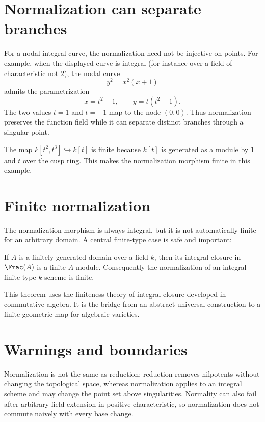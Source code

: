 

\section{Normalization can separate branches}
For a nodal integral curve, the normalization need not be injective on points.  For example, when the displayed
curve is integral (for instance over a field of characteristic not $2$), the nodal curve
\[
y^2=x^2(x+1)
\]
admits the parametrization
\[
x=t^2-1,\qquad y=t(t^2-1).
\]
The two values $t=1$ and $t=-1$ map to the node $(0,0)$.  Thus normalization preserves the function field while
it can separate distinct branches through a singular point.



\begin{example}\label{ex:vi28-expand-03}
The map $k[t^2,t^3]\hookrightarrow k[t]$ is finite because $k[t]$ is generated as a module by $1$ and $t$ over the cusp ring.  This makes the normalization morphism finite in this example.
\end{example}
\section{Finite normalization}
The normalization morphism is always integral, but it is not automatically finite for an arbitrary domain.  A
central finite-type case is safe and important:

\begin{theorem}\label{thm:vi28-finite-normalization}
If $A$ is a finitely generated domain over a field $k$, then its integral closure in $\Frac(A)$ is a finite
$A$-module.  Consequently the normalization of an integral finite-type $k$-scheme is finite.
\end{theorem}

This theorem uses the finiteness theory of integral closure developed in commutative algebra.  It is the bridge
from an abstract universal construction to a finite geometric map for algebraic varieties.



\section{Warnings and boundaries}
Normalization is not the same as reduction: reduction removes nilpotents without changing the topological space,
whereas normalization applies to an integral scheme and may change the point set above singularities.  Normality
can also fail after arbitrary field extension in positive characteristic, so normalization does not commute
naively with every base change.

